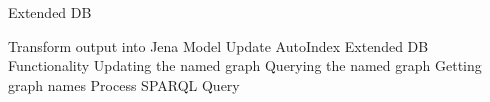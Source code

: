 \begin{frame}{Extended DB}
\begin{outline}
 \1 Transform output into Jena Model
 \1 Update AutoIndex
   \1 Extended DB Functionality
     \2 Updating the named graph
     \2 Querying the named graph
     \2 Getting graph names
     \2 Process SPARQL Query
     
     
\end{outline}
\end{frame}




	